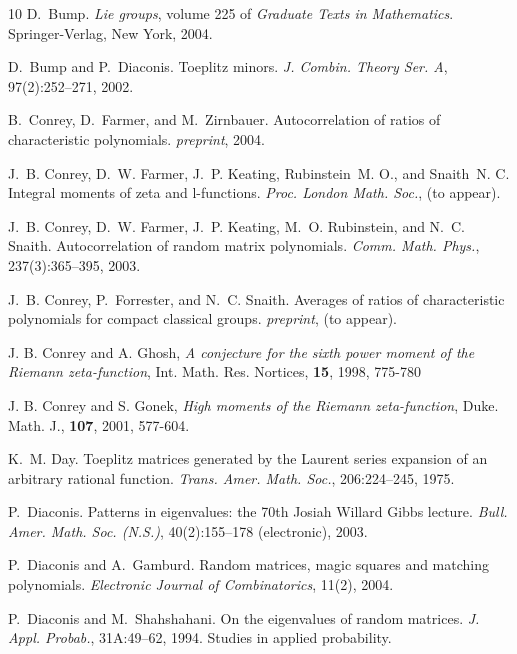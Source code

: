 \documentclass[11pt]{amsart}
\begin{document}
\begin{thebibliography}{10}
D.~Bump. {\newblock} \textit{Lie groups}, volume 225 of
\textit{Graduate Texts in Mathematics}.
{\newblock}Springer-Verlag, New York, 2004.

D.~Bump and P.~Diaconis. {\newblock}Toeplitz minors.
{\newblock} \textit{J. Combin. Theory Ser. A}, 97(2):252--271,
2002.

B.~Conrey, D.~Farmer, and M.~Zirnbauer.
{\newblock}Autocorrelation of ratios of characteristic
polynomials. {\newblock} \textit{preprint}, 2004.

J.~B. Conrey, D.~W. Farmer, J.~P. Keating, Rubinstein~M.
O., and Snaith~N. C. {\newblock}Integral moments of zeta and
l-functions. {\newblock} \textit{Proc. London Math. Soc.}, (to
appear).

J.~B. Conrey, D.~W. Farmer, J.~P. Keating, M.~O.
Rubinstein, and N.~C. Snaith. {\newblock}Autocorrelation of random
matrix polynomials. {\newblock} \textit{Comm. Math. Phys.},
237(3):365--395, 2003.

J.~B. Conrey, P.~Forrester, and N.~C. Snaith.
{\newblock}Averages of ratios of characteristic polynomials for
compact classical groups. {\newblock} \textit{preprint}, (to
appear).

J. B. Conrey and A. Ghosh, \emph{A conjecture for the sixth power
moment of the Riemann zeta-function}, Int. Math. Res. Nortices,
\textbf{15}, 1998, 775-780

J. B. Conrey and S. Gonek, \emph{High moments of the Riemann
zeta-function}, Duke. Math. J., \textbf{107}, 2001, 577-604.



K.~M. Day. {\newblock}Toeplitz matrices generated by the
Laurent series expansion of an arbitrary rational function.
{\newblock} \textit{Trans. Amer. Math. Soc.}, 206:224--245, 1975.

P.~Diaconis. {\newblock}Patterns in eigenvalues: the 70th
Josiah Willard Gibbs lecture. {\newblock} \textit{Bull. Amer.
Math. Soc. (N.S.)}, 40(2):155--178 (electronic), 2003.

P.~Diaconis and A.~Gamburd. {\newblock}Random matrices,
magic squares and matching polynomials. {\newblock}
\textit{Electronic Journal of Combinatorics}, 11(2), 2004.

P.~Diaconis and M.~Shahshahani. {\newblock}On the
eigenvalues of random matrices. {\newblock} \textit{J. Appl.
Probab.}, 31A:49--62, 1994. {\newblock}Studies in applied
probability.


\end{thebibliography}
\end{document}
